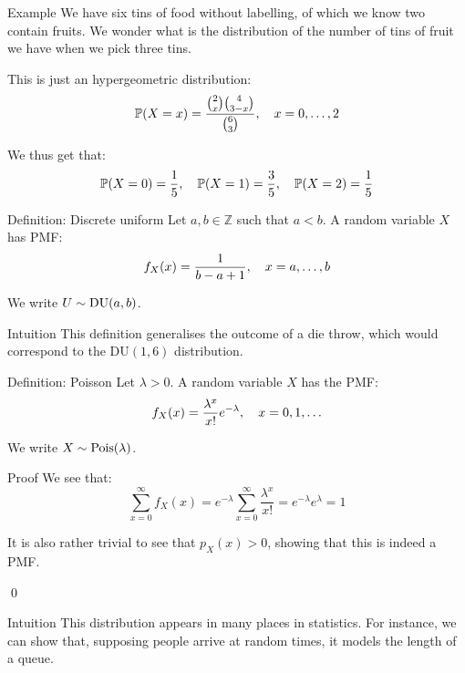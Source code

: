 \documentclass[a4paper]{article}
\begin{document}
\begin{parag}{Example}
    We have six tins of food without labelling, of which we know two contain fruits. We wonder what is the distribution of the number of tins of fruit we have when we pick three tins.

    This is just an hypergeometric distribution: 
    \[\prob\left(X = x\right) = \frac{\binom{2}{x}\binom{4}{3-x}}{\binom{6}{3}}, \mathspace x = 0, \ldots, 2\]
    
    We thus get that: 
    \[\prob\left(X = 0\right) = \frac{1}{5}, \mathspace \prob\left(X = 1\right) = \frac{3}{5}, \mathspace \prob\left(X = 2\right) = \frac{1}{5}\]
\end{parag}

\begin{parag}{Definition: Discrete uniform}
    Let $a, b \in \mathbb{Z}$ such that $a < b$. A  random variable $X$ has PMF: 
    \[f_X\left(x\right) = \frac{1}{b-a+1}, \mathspace x = a, \ldots, b\]
    
    We write $U \followsdistr \text{DU}\left(a, b\right)$.

    \begin{subparag}{Intuition}
        This definition generalises the outcome of a die throw, which would correspond to the $\text{DU}\left(1, 6\right)$ distribution.
    \end{subparag}
\end{parag}

\begin{parag}{Definition: Poisson}
    Let $\lambda > 0$. A  random variable $X$ has the PMF: 
    \[f_X\left(x\right) = \frac{\lambda^x}{x!}e^{-\lambda}, \mathspace x = 0, 1, \ldots\]

    We write $X \followsdistr \text{Pois}\left(\lambda\right)$.
    
    \begin{subparag}{Proof}
        We see that: 
        \[\sum_{x=0}^{\infty} f_X\left(x\right) = e^{-\lambda}\sum_{x=0}^{\infty} \frac{\lambda^x}{x!} = e^{-\lambda} e^{\lambda} = 1\]

        It is also rather trivial to see that $p_X\left(x\right) > 0$, showing that this is indeed a PMF.

        \qed
    \end{subparag}
    
    \begin{subparag}{Intuition}
        This distribution appears in many places in statistics. For instance, we can show that, supposing people arrive at random times, it models the length of a queue.
    \end{subparag}
\end{parag}
\end{document}
